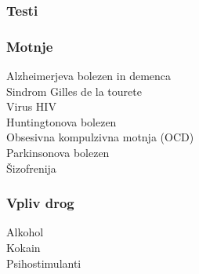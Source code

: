 \documentclass[10pt,a4paper]{article}
\begin{document}
\subsubsection{Testi}

\subsubsection{Motnje}
Alzheimerjeva bolezen in demenca\\
Sindrom Gilles de la tourete\\
Virus HIV\\
Huntingtonova bolezen\\
Obsesivna kompulzivna motnja (OCD)\\
Parkinsonova bolezen\\
Šizofrenija

\subsubsection{Vpliv drog}
Alkohol\\
Kokain\\
Psihostimulanti

\section{}
\end{document}
